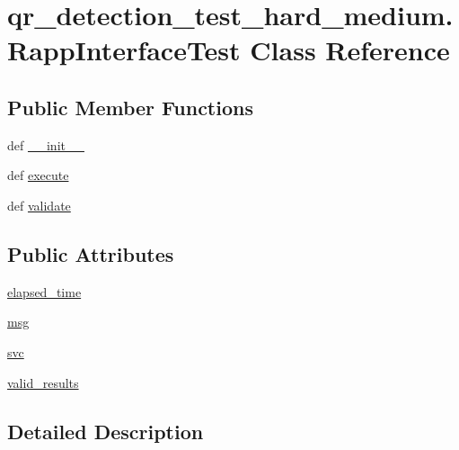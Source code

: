 \hypertarget{classqr__detection__test__hard__medium_1_1RappInterfaceTest}{\section{qr\-\_\-detection\-\_\-test\-\_\-hard\-\_\-medium.\-Rapp\-Interface\-Test Class Reference}
\label{classqr__detection__test__hard__medium_1_1RappInterfaceTest}
}
\subsection*{Public Member Functions}
\begin{DoxyCompactItemize}
\item 
def \hyperlink{classqr__detection__test__hard__medium_1_1RappInterfaceTest_acf94a29b5663c8d25d4853d553cbb9b1}{\-\_\-\-\_\-init\-\_\-\-\_\-}
\item 
def \hyperlink{classqr__detection__test__hard__medium_1_1RappInterfaceTest_a0481ff1433505089891abb7a07084ff0}{execute}
\item 
def \hyperlink{classqr__detection__test__hard__medium_1_1RappInterfaceTest_a4c1321a245332ad7630a0ae02612927e}{validate}
\end{DoxyCompactItemize}
\subsection*{Public Attributes}
\begin{DoxyCompactItemize}
\item 
\hyperlink{classqr__detection__test__hard__medium_1_1RappInterfaceTest_a7e3c71574bdf6153944e5433036d4fb8}{elapsed\-\_\-time}
\item 
\hyperlink{classqr__detection__test__hard__medium_1_1RappInterfaceTest_ae1191fa1926efcb076a506f497fb1a24}{msg}
\item 
\hyperlink{classqr__detection__test__hard__medium_1_1RappInterfaceTest_a1036f7ccf5017795217e49f065a1920e}{svc}
\item 
\hyperlink{classqr__detection__test__hard__medium_1_1RappInterfaceTest_a6387be354239f9a786ad7c404272d7a0}{valid\-\_\-results}
\end{DoxyCompactItemize}


\subsection{Detailed Description}


